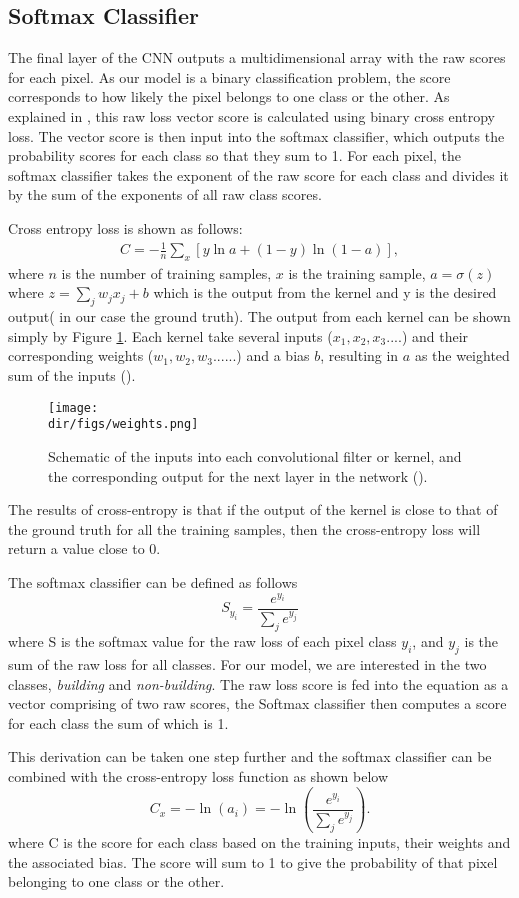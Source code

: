 \subsection{Softmax Classifier}\label{sec.softmax}
The final layer of the CNN outputs a multidimensional array with the raw scores for each pixel. As our model is a binary classification problem, the score corresponds to how likely the pixel belongs to one class or the other. As explained in \citet{Richmond19a}, this raw loss vector score is calculated using binary cross entropy loss. The vector score is then input into the softmax classifier, which outputs the probability scores for each class so that they sum to 1. For each pixel, the softmax classifier takes the exponent of the raw score for each class and divides it by the sum of the exponents of all raw class scores.
\par
Cross entropy loss is shown as follows:
\begin{eqnarray} 
  C = -\frac{1}{n} \sum_x \left[y \ln a + (1-y ) \ln (1-a) \right],
\end{eqnarray}
where $n$ is the number of training samples, $x$ is the training sample, $a = \sigma(z)$ where $z =
\sum_j w_j x_j+b$
which is the output from the kernel and y is the desired output( in our case the ground truth). The output from each kernel can be shown simply by Figure \ref{fig.weights}. Each kernel take several inputs ($x_1, x_2, x_3....$) and their corresponding weights ($w_1, w_2, w_3......$) and a bias $b$, resulting in $a$ as the weighted sum of the inputs (\cite{nielsen15}). 

\begin{figure}[htbp]
    \centering
    \texttt{[image: \\dir/figs/weights.png]}
    \caption[Schematic Convolutional Neuron]{Schematic of the inputs into each convolutional filter or kernel, and the corresponding output for the next layer in the network (\cite{nielsen15}).}
    \label{fig.weights}
\end{figure}

The results of cross-entropy is that if the output of the kernel is close to that of the ground truth for all the training samples, then the cross-entropy loss will return a value close to 0.
\par
The softmax classifier can be defined as follows
\[S_{y_i} = \frac{e^{y_i}}{\sum_j e^{y_j}}\]
where S is the softmax value for the raw loss of each pixel class $y_i$, and $y_j$ is the sum of the raw loss for all classes. For our model, we are interested in the two classes, \textit{building} and \textit{non-building}. The raw loss score is fed into the equation as a vector comprising of two raw scores, the Softmax classifier then computes a score for each class the sum of which is 1.
\par
This derivation can be taken one step further and the softmax classifier can be combined with the cross-entropy loss function as shown below
\[C_x=-\ln(a_i)=-\ln\left(\frac{e^{y_i}}{\sum_je^{y_j}}\right).\]
where C is the score for each class based on the training inputs, their weights and the associated bias. The score will sum to 1 to give the probability of that pixel belonging to one class or the other.

